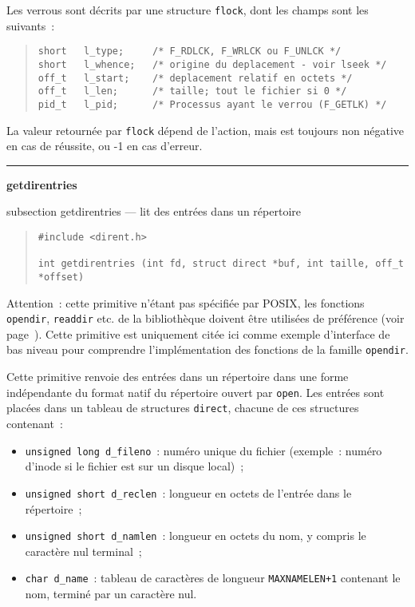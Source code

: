 \documentclass [twoside] {report}
\newcommand {\primitive} [1]
    {
	\phantomsection
	{\large \textbf {#1}}
	\addcontentsline {toc} {subsection} {#1}
    }
\newcommand {\separation}
    {
	\vspace {5mm}
	\nopagebreak
	\hrule
    }
\begin{document}
Les verrous sont décrits par une structure \texttt {flock}, dont les champs
sont les suivants~:

\begin {quote}
\begin {verbatim}
short   l_type;     /* F_RDLCK, F_WRLCK ou F_UNLCK */
short   l_whence;   /* origine du deplacement - voir lseek */
off_t   l_start;    /* deplacement relatif en octets */
off_t   l_len;      /* taille; tout le fichier si 0 */
pid_t   l_pid;      /* Processus ayant le verrou (F_GETLK) */
\end{verbatim}
\end {quote}

La valeur retournée par \texttt {flock} dépend de l'action, mais est
toujours non négative en cas de réussite, ou
-1 en cas d'erreur.




\separation
\primitive {getdirentries} --- lit des entrées dans un répertoire

\begin {quote}
\begin {verbatim}
#include <dirent.h>

int getdirentries (int fd, struct direct *buf, int taille, off_t *offset)
\end{verbatim}
\end {quote}

Attention~:  cette primitive n'étant pas spécifiée par POSIX, les
fonctions \texttt {opendir}, \texttt {readdir} etc.  de la bibliothèque
doivent être utilisées de préférence (voir page~\pageref {opendir}).
Cette primitive est uniquement citée ici comme exemple d'interface de
bas niveau pour comprendre l'implémentation des fonctions de la famille
\texttt {opendir}.

Cette primitive renvoie des entrées dans un répertoire dans une
forme indépendante du format natif du répertoire ouvert par \texttt {open}.
Les entrées sont placées dans un tableau de structures \texttt {direct},
chacune de ces structures contenant~:

\begin {itemize}
    \item \texttt {unsigned long d\_fileno}~:  numéro unique du fichier
	(exemple~:  numéro d'inode si le fichier est sur un disque
	local)~;
    \item \texttt {unsigned short d\_reclen}~: longueur en octets de l'entrée
	dans le répertoire~;
    \item \texttt {unsigned short d\_namlen}~: longueur en octets du nom, y
	compris le caractère nul terminal~;
    \item \texttt {char d\_name}~: tableau de caractères de longueur
	\texttt {MAXNAMELEN+1} contenant le nom, terminé par un
	caractère nul.

\end {itemize}
\end{document}
